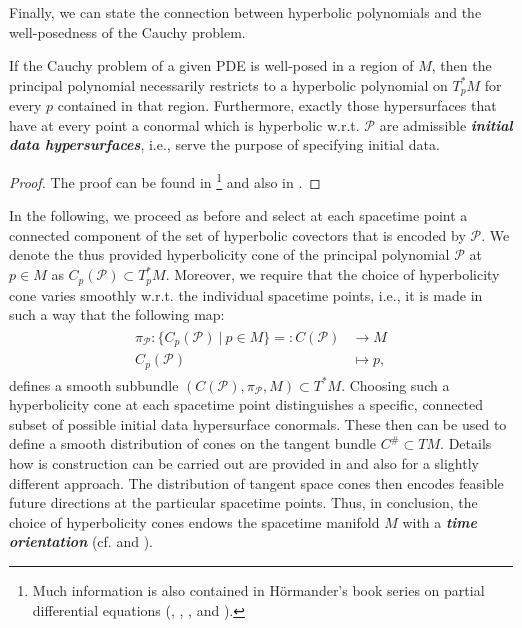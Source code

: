 Finally, we can state the connection between hyperbolic polynomials and the well-posedness of the Cauchy problem.
\begin{theorem}
If the Cauchy problem of a given PDE is well-posed in a region of $M$, then the principal polynomial necessarily restricts to a hyperbolic polynomial on $T_p^{\ast}M$ for every $p$ contained in that region. Furthermore, exactly those hypersurfaces that have at every point a conormal which is hyperbolic w.r.t. $\mathcal{P}$ are admissible \textit{\textbf{initial data hypersurfaces}}, i.e., serve the purpose of specifying initial data.
\end{theorem}
\begin{proof}
The proof can be found in \cite{Hormander1977}\footnote{Much information is also contained in Hörmander's book series on partial differential equations (\cite{hormander1994analysis}, \cite{hormander2004analysis}, \cite{hormander2009analysis}, and \cite{hormander2015analysis}).} and also in \cite{Ivrii_1974}. 
\end{proof}
In the following, we proceed as before and select at each spacetime point a connected component of the set of hyperbolic covectors that is encoded by $\mathcal{P}$. We denote the thus provided hyperbolicity cone of the principal polynomial $\mathcal{P}$ at $p \in M$ as $C_p(\mathcal{P}) \subset T_p^{\ast}M$.
Moreover, we require that the choice of hyperbolicity cone varies smoothly w.r.t. the individual spacetime points, i.e., it is made in such a way that the following map:
\begin{align}
\begin{aligned}
\pi_{\mathcal{P}}: \{ C_p(\mathcal{P}) \ \vert \ p \in M\}=: C(\mathcal{P}) &\longrightarrow M\\
C_p(\mathcal{P}) &\longmapsto p,
\end{aligned}
\end{align}
defines a smooth subbundle $(C(\mathcal{P}), \pi_{\mathcal{P}}, M) \subset T^{\ast}M$.
Choosing such a hyperbolicity cone at each spacetime point distinguishes a specific, connected subset of possible initial data hypersurface conormals. These then can be used to define a smooth distribution of cones on the tangent bundle $C^{\#} \subset TM$. Details how is construction can be carried out are provided in \cite{Rivera} and also \cite{2012arXiv1211.1914K} for a slightly different approach.
The distribution of tangent space cones then encodes feasible future directions at the particular spacetime points.
Thus, in conclusion,  the choice of hyperbolicity cones endows the spacetime manifold $M$ with a \textit{\textbf{time orientation}} (cf. \cite{2012arXiv1211.1914K} and \cite{Rivera}).

